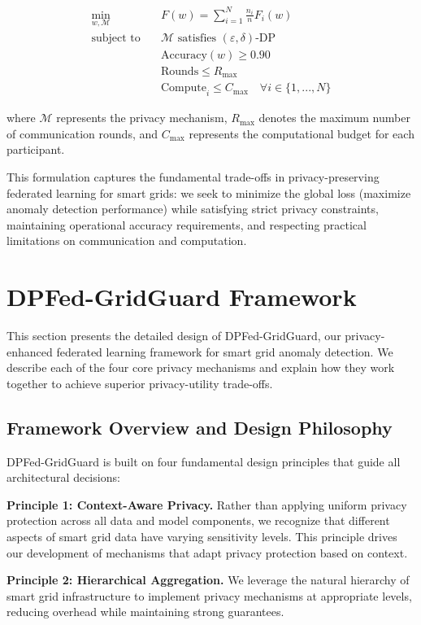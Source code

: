 \documentclass{ieeeaccess}
\theoremstyle{definition}
\begin{document}
\begin{align}
\min_{w, \mathcal{M}} \quad & F(w) = \sum_{i=1}^{N} \frac{n_i}{n} F_i(w) \\
\text{subject to} \quad & \mathcal{M} \text{ satisfies } (\varepsilon, \delta)\text{-DP} \\
& \text{Accuracy}(w) \geq 0.90 \\
& \text{Rounds} \leq R_{\max} \\
& \text{Compute}_{i} \leq C_{\max} \quad \forall i \in \{1, ..., N\}
\end{align}

where $\mathcal{M}$ represents the privacy mechanism, $R_{\max}$ denotes the maximum number of communication rounds, and $C_{\max}$ represents the computational budget for each participant.

This formulation captures the fundamental trade-offs in privacy-preserving federated learning for smart grids: we seek to minimize the global loss (maximize anomaly detection performance) while satisfying strict privacy constraints, maintaining operational accuracy requirements, and respecting practical limitations on communication and computation.

\section{DPFed-GridGuard Framework}
\label{sec:framework}

This section presents the detailed design of DPFed-GridGuard, our privacy-enhanced federated learning framework for smart grid anomaly detection. We describe each of the four core privacy mechanisms and explain how they work together to achieve superior privacy-utility trade-offs.

\subsection{Framework Overview and Design Philosophy}

DPFed-GridGuard is built on four fundamental design principles that guide all architectural decisions:

\textbf{Principle 1: Context-Aware Privacy.} Rather than applying uniform privacy protection across all data and model components, we recognize that different aspects of smart grid data have varying sensitivity levels. This principle drives our development of mechanisms that adapt privacy protection based on context.

\textbf{Principle 2: Hierarchical Aggregation.} We leverage the natural hierarchy of smart grid infrastructure to implement privacy mechanisms at appropriate levels, reducing overhead while maintaining strong guarantees.
\end{document}
